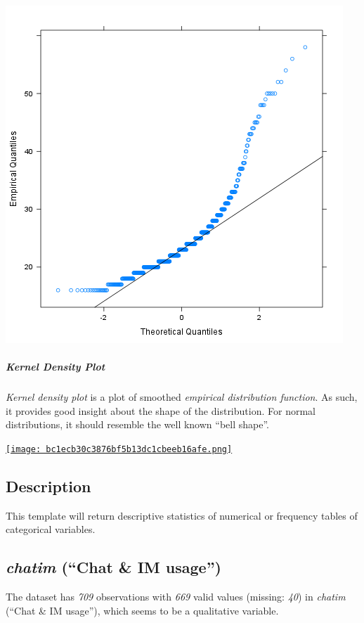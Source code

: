 \documentclass[]{article}
\makeatletter
\def\maxwidth{\ifdim\Gin@nat@width>\linewidth\linewidth
\else\Gin@nat@width\fi}
\let\Oldincludegraphics\includegraphics
\renewcommand{\includegraphics}[1]{\Oldincludegraphics[width=\maxwidth]{#1}}
\makeatother
\begin{document}
\href{131f20f388f78bd4863828d9fed8c35c-hires.png}{\includegraphics{131f20f388f78bd4863828d9fed8c35c.png}}

\subparagraph{Kernel Density Plot}

\emph{Kernel density plot} is a plot of smoothed \emph{empirical
distribution function}. As such, it provides good insight about the
shape of the distribution. For normal distributions, it should resemble
the well known ``bell shape''.

\href{bc1ecb30c3876bf5b13dc1cbeeb16afe-hires.png}{\texttt{[image: bc1ecb30c3876bf5b13dc1cbeeb16afe.png]}}

\subsection{Description}

This template will return descriptive statistics of numerical or
frequency tables of categorical variables.

\subsection{\emph{chatim} (``Chat \& IM usage'')}

The dataset has \emph{709} observations with \emph{669} valid values
(missing: \emph{40}) in \emph{chatim} (``Chat \& IM usage''), which
seems to be a qualitative variable.
\end{document}
